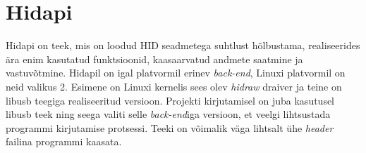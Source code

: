 \section{Hidapi}
Hidapi on teek, mis on loodud HID seadmetega suhtlust hõlbustama, realiseerides ära enim kasutatud funktsioonid, kaasaarvatud andmete saatmine ja vastuvõtmine.
Hidapil on igal platvormil erinev \textit{back-end}, Linuxi platvormil on neid valikus 2.
Esimene on Linuxi kernelis sees olev \textit{hidraw} draiver ja teine on libusb teegiga realiseeritud versioon.
Projekti kirjutamisel on juba kasutusel libusb teek ning seega valiti selle \textit{back-end}iga versioon, et veelgi lihtsustada programmi kirjutamise protsessi.
Teeki on võimalik väga lihtsalt ühe \textit{header} failina programmi kaasata.\cite{hidapi}
